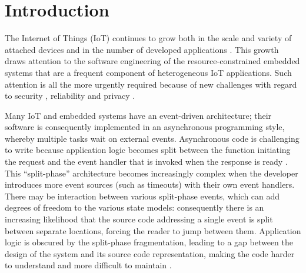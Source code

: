 \documentclass[format=acmsmall, review=false, screen=false]{acmart}
\begin{document}


%
%



\maketitle


\section{Introduction}


The Internet of Things (IoT) \cite{Al-Fuqaha2015, Atzori2010, Gubbi2013} continues to grow both in the scale and variety of attached devices and in the number of developed applications \cite{Manyika2015, VanderMeulen2017}. This growth draws attention to the software engineering of the resource-constrained embedded systems that are a frequent component of heterogeneous IoT applications. Such attention is all the more urgently required because of new challenges with regard to security \cite{Sicari2015}, reliability \cite{Gubbi2013} and privacy \cite{Weber2015}.

Many IoT and embedded systems have an event-driven architecture; their software is consequently implemented in an asynchronous programming style, whereby multiple tasks wait on external events. Asynchronous code is challenging to write because application logic becomes split between the function initiating the request and the event handler that is invoked when the response is ready \cite{Gay2003, Levis2002, Meijer2010}. This “split-phase” architecture becomes increasingly complex when the developer introduces more event sources (such as timeouts) with their own event handlers. There may be interaction between various split-phase events, which can add degrees of freedom to the various state models: consequently there is an increasing likelihood that the source code addressing a single event is split between separate locations, forcing the reader to jump between them. Application logic is obscured by the split-phase fragmentation, leading to a gap between the design of the system and its source code representation, making the code harder to understand and more difficult to maintain \cite{Brodu2015, Edwards2009, Madsen2017, Kambona2013}.
\end{document}
